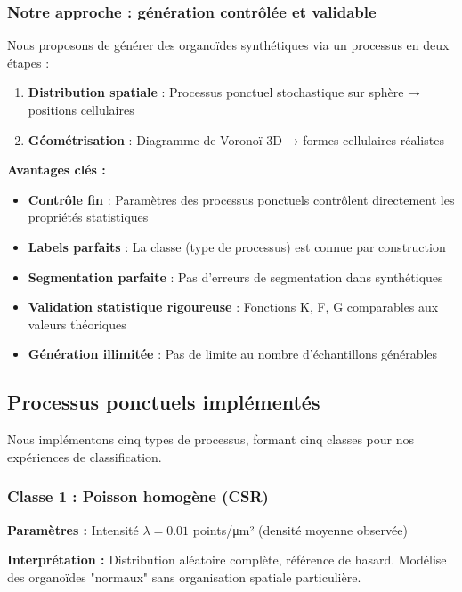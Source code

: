\subsubsection{Notre approche : génération contrôlée et validable}

Nous proposons de générer des organoïdes synthétiques via un processus en deux étapes :
\begin{enumerate}
    \item \textbf{Distribution spatiale} : Processus ponctuel stochastique sur sphère → positions cellulaires
    \item \textbf{Géométrisation} : Diagramme de Voronoï 3D → formes cellulaires réalistes
\end{enumerate}

\textbf{Avantages clés :}
\begin{itemize}
    \item \textbf{Contrôle fin} : Paramètres des processus ponctuels contrôlent directement les propriétés statistiques
    \item \textbf{Labels parfaits} : La classe (type de processus) est connue par construction
    \item \textbf{Segmentation parfaite} : Pas d'erreurs de segmentation dans synthétiques
    \item \textbf{Validation statistique rigoureuse} : Fonctions K, F, G comparables aux valeurs théoriques
    \item \textbf{Génération illimitée} : Pas de limite au nombre d'échantillons générables
\end{itemize}

\subsection{Processus ponctuels implémentés}

Nous implémentons cinq types de processus, formant cinq classes pour nos expériences de classification.

\subsubsection{Classe 1 : Poisson homogène (CSR)}

\textbf{Paramètres :} Intensité $\lambda = 0.01$ points/μm² (densité moyenne observée)

\textbf{Interprétation :} Distribution aléatoire complète, référence de hasard. Modélise des organoïdes "normaux" sans organisation spatiale particulière.


